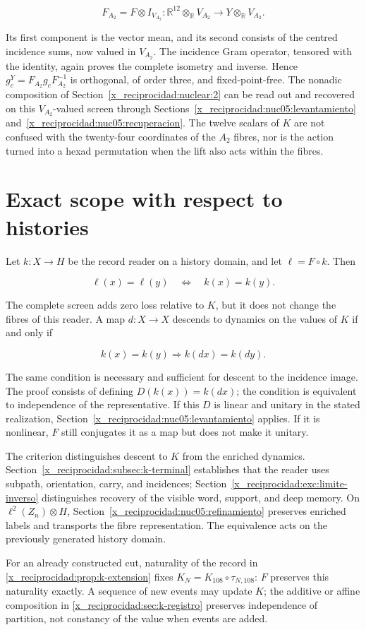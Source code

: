 \[
F_{A_2}=F\otimes I_{V_{A_2}}:
\mathbb R^{12}\otimes_{\mathbb R}V_{A_2}
\longrightarrow Y\otimes_{\mathbb R}V_{A_2}.
\]

Its first component is the vector mean, and its second consists of the centred incidence sums, now valued in \(V_{A_2}\). The incidence Gram operator, tensored with the identity, again proves the complete isometry and inverse. Hence \(g_c^Y=F_{A_2}g_cF_{A_2}^{-1}\) is orthogonal, of order three, and fixed-point-free. The nonadic composition of Section~\ref{x_reciprocidad:nuclear:2} can be read out and recovered on this \(V_{A_2}\)-valued screen through Sections~\ref{x_reciprocidad:nuc05:levantamiento} and~\ref{x_reciprocidad:nuc05:recuperacion}. The twelve scalars of \(K\) are not confused with the twenty-four coordinates of the \(A_2\) fibres, nor is the action turned into a hexad permutation when the lift also acts within the fibres.

\section{Exact scope with respect to histories}

Let \(k:X\to H\) be the record reader on a history domain, and let \(\ell=F\circ k\). Then

\[
\ell(x)=\ell(y)\quad\Longleftrightarrow\quad k(x)=k(y).
\]

The complete screen adds zero loss relative to \(K\), but it does not change the fibres of this reader. A map \(d:X\to X\) descends to dynamics on the values of \(K\) if and only if

\[
k(x)=k(y)\Longrightarrow k(d x)=k(d y).
\]

The same condition is necessary and sufficient for descent to the incidence image. The proof consists of defining \(D(k(x))=k(dx)\); the condition is equivalent to independence of the representative. If this \(D\) is linear and unitary in the stated realization, Section~\ref{x_reciprocidad:nuc05:levantamiento} applies. If it is nonlinear, \(F\) still conjugates it as a map but does not make it unitary.

The criterion distinguishes descent to \(K\) from the enriched dynamics. Section~\ref{x_reciprocidad:subsec:k-terminal} establishes that the reader uses subpath, orientation, carry, and incidences; Section~\ref{x_reciprocidad:exc:limite-inverso} distinguishes recovery of the visible word, support, and deep memory. On \(\ell^2(Z_n)\otimes H\), Section~\ref{x_reciprocidad:nuc05:refinamiento} preserves enriched labels and transports the fibre representation. The equivalence acts on the previously generated history domain.

For an already constructed cut, naturality of the record in \cref{x_reciprocidad:prop:k-extension} fixes \(K_N=K_{108}\circ\tau_{N,108}\): \(F\) preserves this naturality exactly. A sequence of new events may update \(K\); the additive or affine composition in \cref{x_reciprocidad:sec:k-registro} preserves independence of partition, not constancy of the value when events are added.
